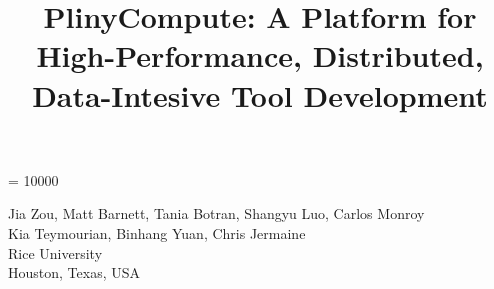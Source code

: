 \documentclass[11pt]{article}
\begin{document}
\widowpenalty = 10000

\date{}
\title{PlinyCompute: A Platform for High-Performance, Distributed, Data-Intesive Tool Development}
\maketitle


\begin{center} Jia Zou, Matt Barnett, Tania Botran, Shangyu Luo, Carlos Monroy \\ Kia Teymourian, Binhang Yuan, Chris Jermaine \\

\vspace{5 pt}
Rice University \\
Houston, Texas, USA
\end{center}





























\end{document}
